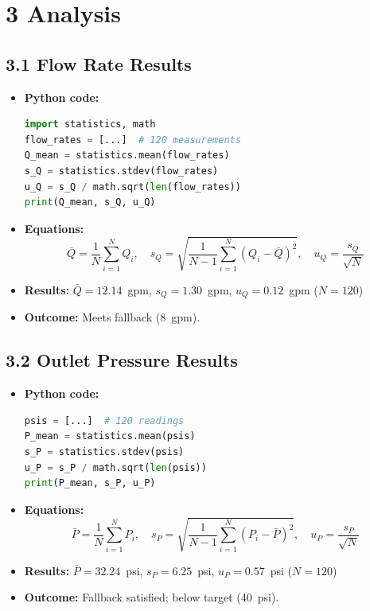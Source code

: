 \documentclass[12pt]{article}
\begin{document}
\newpage
\section*{3\; Analysis}

\subsection*{3.1\; Flow Rate Results}
\begin{itemize}[leftmargin=*]
  \item \textbf{Python code:}
    \begin{lstlisting}[language=Python]
import statistics, math
flow_rates = [...]  # 120 measurements
Q_mean = statistics.mean(flow_rates)
s_Q = statistics.stdev(flow_rates)
u_Q = s_Q / math.sqrt(len(flow_rates))
print(Q_mean, s_Q, u_Q)
    \end{lstlisting}
  \item \textbf{Equations:}
    \[
      \bar Q = \frac{1}{N}\sum_{i=1}^N Q_i,\quad
      s_Q = \sqrt{\frac{1}{N-1}\sum_{i=1}^N (Q_i - \bar Q)^2},\quad
      u_Q = \frac{s_Q}{\sqrt{N}}
    \]
  \item \textbf{Results:} $\bar Q = 12.14$ gpm, $s_Q = 1.30$ gpm, $u_Q = 0.12$ gpm ($N=120$)
  \item \textbf{Outcome:} Meets fallback (8 gpm).
\end{itemize}

\subsection*{3.2\; Outlet Pressure Results}
\begin{itemize}[leftmargin=*]
  \item \textbf{Python code:}
    \begin{lstlisting}[language=Python]
psis = [...]  # 120 readings
P_mean = statistics.mean(psis)
s_P = statistics.stdev(psis)
u_P = s_P / math.sqrt(len(psis))
print(P_mean, s_P, u_P)
    \end{lstlisting}
  \item \textbf{Equations:}
    \[
      \bar P = \frac{1}{N}\sum_{i=1}^N P_i,\quad
      s_P = \sqrt{\frac{1}{N-1}\sum_{i=1}^N (P_i - \bar P)^2},\quad
      u_P = \frac{s_P}{\sqrt{N}}
    \]
  \item \textbf{Results:} $\bar P = 32.24$ psi, $s_P = 6.25$ psi, $u_P = 0.57$ psi ($N=120$)
  \item \textbf{Outcome:} Fallback satisfied; below target (40 psi).
\end{itemize}
\end{document}
